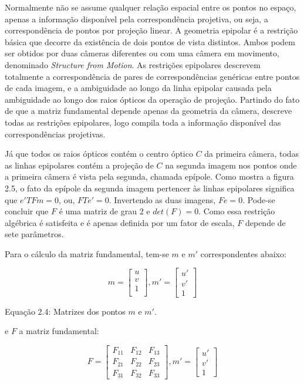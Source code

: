 Normalmente não se assume qualquer relação espacial entre os pontos no espaço, apenas a informação disponível pela correspondência projetiva, ou seja, a correspondência de pontos por projeção linear. A geometria epipolar é a restrição básica que decorre da existência de dois pontos de vista distintos. Ambos podem ser obtidos por duas câmeras diferentes ou com uma câmera em movimento, denominado \textit{Structure from Motion}. As restrições epipolares descrevem totalmente a correspondência de pares de correspondências genéricas entre pontos de cada imagem, e a ambiguidade ao longo da linha epipolar causada pela ambiguidade ao longo dos raios ópticos da operação de projeção. Partindo do fato de que a matriz fundamental depende apenas da geometria da câmera, descreve todas as restrições epipolares, logo compila toda a informação disponível das correspondências projetivas. 

Já que todos os raios ópticos contém o centro óptico $C$ da primeira câmera, todas as linhas epipolares contém a projeção de $C$ na segunda imagem nos pontos onde a primeira câmera é vista pela segunda, chamada epípole. Como mostra a figura 2.5, o fato da epípole  da segunda imagem pertencer às linhas epipolares significa que $e'TFm = 0$, ou, $FTe' = 0$. Invertendo as duas imagens, $Fe = 0$. Pode-se concluir que $F$ é uma matriz de grau 2 e $det(F) = 0$. Como essa restrição algébrica é satisfeita e é apenas definida por um fator de escala, $F$ depende de sete parâmetros.

Para o cálculo da matriz fundamental, tem-se $m$ e $m'$ correspondentes abaixo:

$$
m = \begin{bmatrix}u\\v\\1\\ \end{bmatrix}, m' = \begin{bmatrix}u'\\v'\\1\end{bmatrix}
$$

Equação 2.4: Matrizes dos pontos $m$ e $m'$.

e $F$ a matriz fundamental:

$$
F = 
\begin{bmatrix}
	F_{11} &  F_{12} &  F_{13}\\
	F_{21} &  F_{22} &  F_{23}\\
	F_{31} &  F_{32} &  F_{33}
\end{bmatrix}, m' = \begin{bmatrix}u'\\v'\\1\end{bmatrix}
$$

